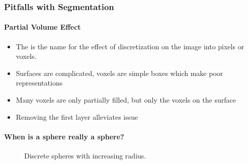 \documentclass[letterpaper,10pt,english]{sphinxmanual}
\begin{document}
\noindent{}


\subsubsection{Pitfalls with Segmentation}
\label{\detokenize{04-BasicSegmentation_Part2:pitfalls-with-segmentation}}

\paragraph{Partial Volume Effect}
\label{\detokenize{04-BasicSegmentation_Part2:partial-volume-effect}}\begin{itemize}
\item {} 
\sphinxAtStartPar
The  is the name for the effect of discretization on the image into pixels or voxels.

\item {} 
\sphinxAtStartPar
Surfaces are complicated, voxels are simple boxes which make poor representations

\item {} 
\sphinxAtStartPar
Many voxels are only partially filled, but only the voxels on the surface

\item {} 
\sphinxAtStartPar
Removing the first layer alleviates issue

\end{itemize}


\paragraph{When is a sphere really a sphere?}
\label{\detokenize{04-BasicSegmentation_Part2:when-is-a-sphere-really-a-sphere}}
\begin{figure}[htbp]
\centering
\capstart

\noindent{}
\caption{Discrete spheres with increasing radius.}\label{\detokenize{04-BasicSegmentation_Part2:id3}}\end{figure}
\end{document}
